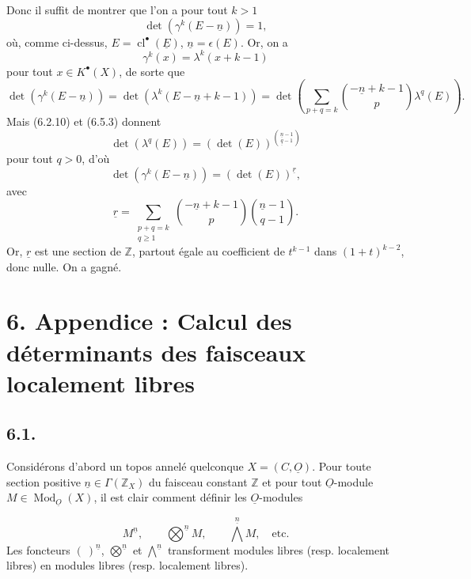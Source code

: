 \documentclass{article}
\newcommand{\cl}{\operatorname{cl}}
\newcommand{\Mod}{\operatorname{Mod}}
\begin{document}
Donc il suffit de montrer que l'on a pour tout \(k>1\)
\[
 \det(\gamma^k(E-\underline{n}))=1,
\]
où, comme ci-dessus, \(E=\cl^{\bullet}(\underline E)\), \(\underline{n}=\epsilon(E)\). Or, on a
\[
 \gamma^k(x)=\lambda^k(x+k-1)
\]
pour tout \(x\in K^{\bullet}(X)\), de sorte que
\[
 \det(\gamma^k(E-\underline{n}))
 =
 \det(\lambda^k(E-\underline{n}+k-1))
 =
 \det\left(\sum_{p+q=k}\binom{-\underline{n}+k-1}{p}\lambda^q(E)\right).
\]
Mais (6.2.10) et (6.5.3) donnent
\[
 \det(\lambda^q(E))=(\det(E))^{\binom{\underline{n}-1}{\underline{q}-1}}
\]
pour tout \(q>0\), d'où
\[
 \det(\gamma^k(E-\underline{n}))=(\det(E))^{\underline{r}},
\]
avec
\[
 \underline{r}=\sum_{\substack{p+q=k\\ q\geq1}}
 \binom{-\underline{n}+k-1}{p}\binom{\underline{n}-1}{q-1}.
\]
Or, \(\underline{r}\) est une section de \(\mathbb Z\), partout égale au coefficient de \(t^{k-1}\) dans \((1+t)^{k-2}\), donc nulle. On a gagné.

\section*{6. Appendice : Calcul des déterminants des faisceaux localement libres}

\subsection*{6.1.}
Considérons d'abord un topos annelé quelconque \(X=({C},\underline{O})\). Pour toute section positive \(\underline{n}\in\Gamma(\mathbb Z_X)\) du faisceau constant \(\mathbb Z\) et pour tout \(\underline{O}\)-module \(M\in\Mod_{\underline{O}}(X)\), il est clair comment définir les \(\underline{O}\)-modules

\clearpage
\begin{equation}\tag{6.1.1}
 M^{\underline{n}},\qquad \bigotimes^{\underline{n}} M,\qquad \bigwedge^{\underline{n}} M,\quad\text{etc.}
\end{equation}
Les
foncteurs \((\ )^{\underline{n}}\), \(\bigotimes\limits^{\underline{n}}\) et \(\bigwedge\limits^{\underline{n}}\) transforment modules libres (resp. localement libres) en modules libres (resp. localement libres).
\end{document}
